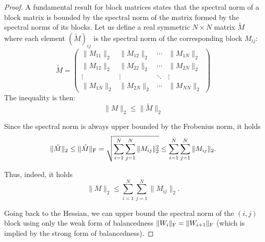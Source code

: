 \documentclass[a4paper,11pt]{article}
\newcommand{\1}{\mathbbm{1}}
\theoremstyle{plain}
\begin{document}
\begin{proof}
A fundamental result for block matrices states that the spectral norm of a block matrix is bounded by the spectral norm of the matrix formed by the spectral norms of its blocks. Let us define a real symmetric $N \times N$ matrix $\tilde{M}$ where each element $(\tilde{M})_{ij}$ is the spectral norm of the corresponding block $M_{ij}$:
\[
\tilde{M} = \begin{pmatrix}
\|M_{11}\|_2 & \|M_{12}\|_2 & \cdots & \|M_{1N}\|_2 \\
\|M_{12}\|_2 & \|M_{22}\|_2 & \cdots & \|M_{2N}\|_2 \\
\vdots & \vdots & \ddots & \vdots \\
\|M_{1N}\|_2 & \|M_{2N}\|_2 & \cdots & \|M_{NN}\|_2
\end{pmatrix}
\]
The inequality is then:
\begin{equation*}
\|M\|_2 \le \|\tilde{M}\|_2
\end{equation*}

Since the spectral norm is always upper bounded by the Frobenius norm, it holds 
\begin{equation*}
\|\tilde{M}\|_2 \le \|\tilde{M}\|_{\rm F} = \sqrt{\sum_{i=1}^N \sum_{j=1}^N \|M_{ij}\|_2^2} \leq \sum_{i=1}^N \sum_{j=1}^N \|M_{ij}\|_2.
\end{equation*}

Thus, indeed, it holds
\begin{equation}
\label{eq:basic_bound_spectral_norm}
    \|M\|_2 \leq \sum_{i=1}^N \sum_{j=1}^N \|M_{ij}\|_2.
\end{equation}




Going back to the Hessian, we can upper bound the spectral norm of the $(i,j)$ block using only the weak form of balancedness $\|W_i\|_{\rm F} = \|W_{i+1}\|_{\rm F}$ (which is implied by the strong form of balancedness). 


\end{proof}
\end{document}

